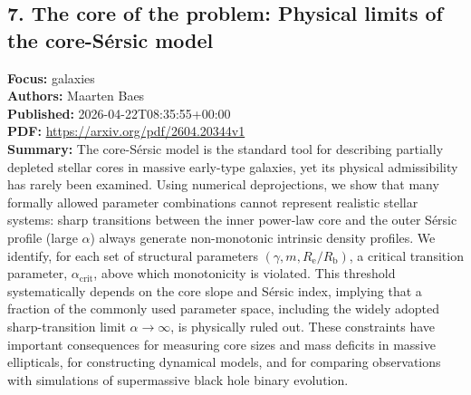\documentclass[11pt]{article}
\begin{document}
\subsection*{7. The core of the problem: Physical limits of the core-Sérsic model}
\textbf{Focus:} galaxies\\
\textbf{Authors:} Maarten Baes\\
\textbf{Published:} 2026-04-22T08:35:55+00:00\\
\textbf{PDF:} \href{https://arxiv.org/pdf/2604.20344v1}{https://arxiv.org/pdf/2604.20344v1}\\
\textbf{Summary:}
The core-Sérsic model is the standard tool for describing partially depleted stellar cores in massive early-type galaxies, yet its physical admissibility has rarely been examined. Using numerical deprojections, we show that many formally allowed parameter combinations cannot represent realistic stellar systems: sharp transitions between the inner power-law core and the outer Sérsic profile (large $\alpha $) always generate non-monotonic intrinsic density profiles. We identify, for each set of structural parameters $(\gamma , m, R_{\text{e}}/R_{\text{b}})$, a critical transition parameter, $\alpha _{\text{crit}}$, above which monotonicity is violated. This threshold systematically depends on the core slope and Sérsic index, implying that a fraction of the commonly used parameter space, including the widely adopted sharp-transition limit $\alpha \rightarrow\infty$, is physically ruled out. These constraints have important consequences for measuring core sizes and mass deficits in massive ellipticals, for constructing dynamical models, and for comparing observations with simulations of supermassive black hole binary evolution.
\newpage
\end{document}
